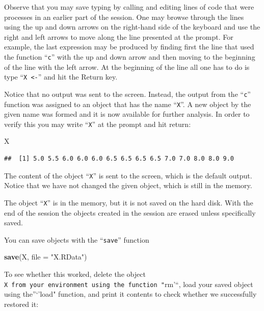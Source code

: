 \documentclass[
]{krantz}
\makeatletter
\newenvironment{Shaded}{\begin{snugshade}}{\end{snugshade}}
\newcommand{\DataTypeTok}[1]{\textcolor[rgb]{0.13,0.29,0.53}{#1}}
\newcommand{\KeywordTok}[1]{\textcolor[rgb]{0.13,0.29,0.53}{\textbf{#1}}}
\newcommand{\NormalTok}[1]{#1}
\newcommand{\StringTok}[1]{\textcolor[rgb]{0.31,0.60,0.02}{#1}}
\newenvironment{kframe}{%
\medskip{}
\setlength{\fboxsep}{.8em}
 \def\at@end@of@kframe{}%
 \ifinner\ifhmode%
  \def\at@end@of@kframe{\end{minipage}}%
  \begin{minipage}{\columnwidth}%
 \fi\fi%
 \def\FrameCommand##1{\hskip\@totalleftmargin \hskip-\fboxsep
 \colorbox{shadecolor}{##1}\hskip-\fboxsep
     \hskip-\linewidth \hskip-\@totalleftmargin \hskip\columnwidth}%
 \MakeFramed {\advance\hsize-\width
   \@totalleftmargin\z@ \linewidth\hsize
   \@setminipage}}%
 {\par\unskip\endMakeFramed%
 \at@end@of@kframe}
\renewenvironment{Shaded}{\begin{kframe}}{\end{kframe}}
\theoremstyle{definition}
\theoremstyle{definition}
\theoremstyle{definition}
\theoremstyle{remark}
\makeatother
\begin{document}
Observe that you may save typing by calling and editing lines of code that were processes in an earlier part of the session. One may browse through the lines using the up and down arrows on the right-hand side of the keyboard and use the right and left arrows to move along the line presented at the prompt. For example, the last expression may be produced by finding first the line that used the function ``\texttt{c}'' with the up and down arrow and then moving to the beginning of the line with the left arrow. At the beginning of the line all one has to do is type ``\texttt{X\ \textless{}-}'' and hit the Return key.

Notice that no output was sent to the screen. Instead, the output from the ``\texttt{c}'' function was assigned to an object that has the name ``\texttt{X}''. A new object by the given name was formed and it is now available for further analysis. In order to verify this you may write ``\texttt{X}'' at the prompt and hit return:

\begin{Shaded}
\begin{Highlighting}[]
\NormalTok{X}
\end{Highlighting}
\end{Shaded}

\begin{verbatim}
##  [1] 5.0 5.5 6.0 6.0 6.0 6.5 6.5 6.5 6.5 7.0 7.0 8.0 8.0 9.0
\end{verbatim}

The content of the object ``\texttt{X}'' is sent to the screen, which is the default output. Notice that we have not changed the given object, which is still in the memory.

The object ``\texttt{X}'' is in the memory, but it is not saved on the hard disk. With the end of the session the objects created in the session are erased unless specifically saved.

You can save objects with the ``\texttt{save}'' function

\begin{Shaded}
\begin{Highlighting}[]
\KeywordTok{save}\NormalTok{(X, }\DataTypeTok{file =} \StringTok{"X.RData"}\NormalTok{)}
\end{Highlighting}
\end{Shaded}

To see whether this worked, delete the object \texttt{X\textquotesingle{}\ from\ your\ environment\ using\ the\ function\ "}rm'``, load your saved object using the''`'load" function, and print it contents to check whether we successfully restored it:
\end{document}
